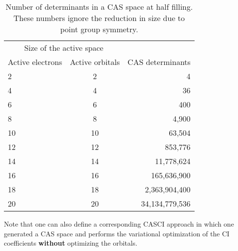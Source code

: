 \documentclass[../Main/chem532-notes.tex]{subfiles}
\begin{document}
\begin{table}[htbp]
   \centering
   \begin{tabular}{@{} lcr @{}} %
      \toprule
      \multicolumn{2}{c}{Size of the active space} \\
      \cmidrule(r){1-2} %
      Active electrons    & Active orbitals & CAS determinants\\
      \midrule
      2 & 2 & 4 \\
      4 & 4 & 36 \\
      6 & 6 & 400 \\
      8 & 8 & 4,900 \\
      10 & 10 & 63,504 \\
      12 & 12 & 853,776 \\
      14 & 14 & 11,778,624 \\
      16 & 16 & 165,636,900 \\
      18 & 18 & 2,363,904,400 \\
      20 & 20 & 34,134,779,536 \\
      \bottomrule
   \end{tabular}
   \caption{Number of determinants in a CAS space at half filling. These numbers ignore the reduction in size due to point group symmetry.}
   \label{tab:cas_size}
\end{table}

Note that one can also define a corresponding CASCI approach in which one generated a CAS space and performs the variational optimization of the CI coefficients \textbf{without} optimizing the orbitals.
\end{document}
